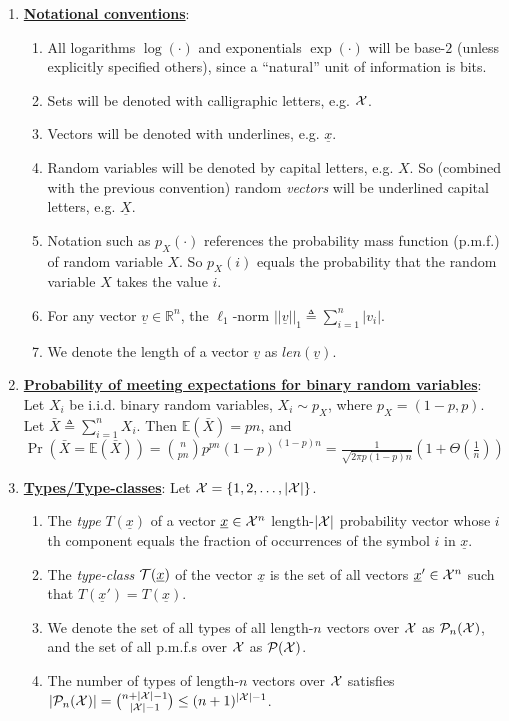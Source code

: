 \documentclass[10pt]{article}
\begin{document}
\begin{enumerate}
\item {\bf \underline{Notational conventions}}: 
\begin{enumerate}
	\item All logarithms $\log(\cdot)$ and exponentials $\exp(\cdot)$ will be base-$2$ (unless explicitly specified others), since a ``natural'' unit of information is bits.
	\item Sets will be denoted with calligraphic letters, e.g. $\cal{X}$.
	\item \label{(c)} Vectors will be denoted with underlines, e.g. $\underline{x}$.
	\item \label{(d)} Random variables will be denoted by capital letters, e.g. $X$. So (combined with the previous convention) random {\it vectors} will be underlined capital letters, e.g. $\underline{X}$.
	\item Notation such as $p_X(\cdot)$ references the probability mass function (p.m.f.) of random variable $X$. So $p_X(i)$ equals the probability that the random variable $X$ takes the value $i$.
		\item For any vector $\underline{v} \in {\mathbb R}^n$, the $\ell_1$-norm $||\underline{v} ||_1 \triangleq \sum_{i=1}^n |v_i|$.
		\item We denote the length of a vector $\underline{v}$ as $len(\underline{v})$.
\end{enumerate}

\item {\bf \underline{Probability of meeting expectations for binary random variables}}: Let $X_i$ be i.i.d. binary random variables, $X_i \sim p_X$, where $p_X = (1-p,p)$. Let $\bar{X} \triangleq \sum_{i=1}^n X_i$. Then ${\mathbb E}(\bar{X}) = pn$, and  $\Pr(\bar{X} = {\mathbb E}(\bar{X})) = {{n}\choose{pn}}p^{pn}(1-p)^{(1-p)n} = \frac{1}{\sqrt{2\pi p(1-p)n}} \left (1 + \Theta\left ( \frac{1}{n}\right ) \right ) $

\item {\bf \underline{Types/Type-classes}}: Let ${\cal X} = \{1,2,\ldots,|{\cal X}|\}$. 
	\begin{enumerate}
		\item The {\it type} $T(\underline{x})$ of a vector $\underline{x} \in {\cal X}^n$ length-$|\cal X|$ probability vector whose $i$th component equals the fraction of occurrences of the symbol $i$ in $\underline{x}$. 
		\item The {\it type-class} ${\cal T}(\underline{x})$ of the vector $\underline{x}$ is the set of all vectors $\underline{x}' \in {\cal X}^n$ such that $T(\underline{x}') = T(\underline{x})$.
		\item We denote the { set of all types} of all length-$n$ vectors over ${\cal X}$ as ${\cal P}_n(\cal X)$, and the set of all p.m.f.s over ${\cal X}$ as ${\cal P}(\cal X)$.
		\item The number of types of length-$n$ vectors over ${\cal X}$ satisfies $|{\cal P}_n({\cal X})| = {{n+|{\cal X}|-1}\choose{|{\cal X}|-1}} \leq (n+1)^{|{\cal X}|-1}$.
\end{enumerate}


\end{enumerate}
\end{document}
